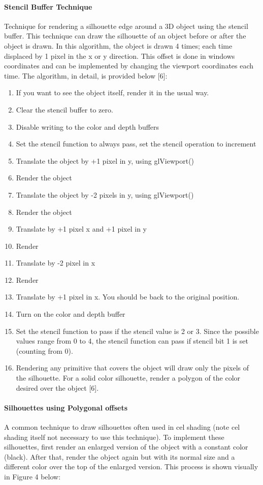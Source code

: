\paragraph{Stencil Buffer Technique}
Technique for rendering a silhouette edge around a 3D object using the stencil buffer.
This technique can draw the silhouette of an object before or after the object is drawn.
In this algorithm, the object is drawn 4 times; each time displaced by 1 pixel in the x or y direction. \cite{silhouette}
This offset is done in windows coordinates and can be implemented by changing the viewport coordinates each time.
The algorithm, in detail, is provided below [6]:
\begin{enumerate}
\item If you want to see the object itself, render it in the usual way.
\item Clear the stencil buffer to zero.
\item Disable writing to the color and depth buffers
\item Set the stencil function to always pass, set the stencil operation to increment
\item Translate the object by +1 pixel in y, using glViewport()
\item Render the object
\item Translate the object by -2 pixels in y, using glViewport()
\item Render the object
\item Translate by +1 pixel x and +1 pixel in y
\item Render
\item Translate by -2 pixel in x
\item Render
\item Translate by +1 pixel in x. You should be back to the original position.
\item Turn on the color and depth buffer
\item Set the stencil function to pass if the stencil value is 2 or 3. Since the possible values range from 0 to 4, the stencil function can pass if stencil bit 1 is set (counting from 0).
\item Rendering any primitive that covers the object will draw only the pixels of the silhouette. For a solid color silhouette, render a polygon of the color desired over the object [6].
\end{enumerate}

\newpage

\paragraph{Silhouettes using Polygonal offsets}
A common technique to draw silhouettes often used in cel shading (note cel shading itself not necessary to use this technique).
To implement these silhouettes, first render an enlarged version of the object with a constant color (black). \cite{nonphotorealisticsilhouette}
After that, render the object again but with its normal size and a different color over the top of the enlarged version.
This process is shown visually in Figure 4 below:

